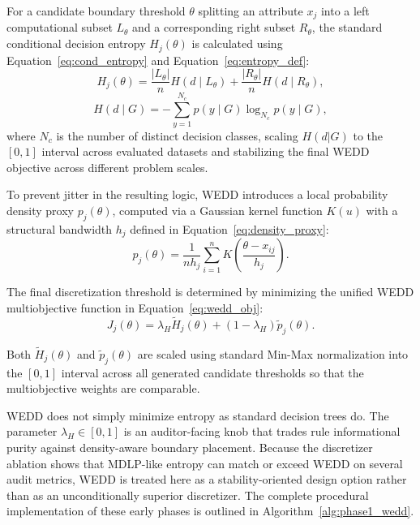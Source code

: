 \documentclass[make,article,submit,pdftex,moreauthors]{Definitions/mdpi}
\begin{document}
For a candidate boundary threshold $\theta$ splitting an attribute $x_j$ into a left computational subset $L_\theta$ and a corresponding right subset $R_\theta$, the standard conditional decision entropy $H_j(\theta)$ is calculated using Equation~\eqref{eq:cond_entropy} and Equation~\eqref{eq:entropy_def}:
\begin{equation}
 \label{eq:cond_entropy}
 H_j(\theta) = \frac{|L_\theta|}{n}H(d\mid L_\theta) + \frac{|R_\theta|}{n}H(d\mid R_\theta),
\end{equation}
\begin{equation}
 \label{eq:entropy_def}
 H(d\mid G) = -\sum_{y=1}^{N_c}p(y\mid G)\log_{N_c} p(y\mid G),
\end{equation}
where $N_c$ is the number of distinct decision classes, scaling $H(d|G)$ to the $[0,1]$ interval across evaluated datasets and stabilizing the final WEDD objective across different problem scales.

To prevent jitter in the resulting logic, WEDD introduces a local probability density proxy $p_j(\theta)$, computed via a Gaussian kernel function $K(u)$ with a structural bandwidth $h_j$ defined in Equation~\eqref{eq:density_proxy}:
\begin{equation}
 \label{eq:density_proxy}
 p_j(\theta) = \frac{1}{n h_j}\sum_{i=1}^{n}K\left(\frac{\theta-x_{ij}}{h_j}\right).
\end{equation}

The final discretization threshold is determined by minimizing the unified WEDD multiobjective function in Equation~\eqref{eq:wedd_obj}:
\begin{equation}
 \label{eq:wedd_obj}
 J_j(\theta) = \lambda_H\widetilde{H}_j(\theta) + (1-\lambda_H)\widetilde{p}_j(\theta).
\end{equation}

Both $\widetilde{H}_j(\theta)$ and $\widetilde{p}_j(\theta)$ are scaled using standard Min-Max normalization into the $[0,1]$ interval across all generated candidate thresholds so that the multiobjective weights are comparable.

WEDD does not simply minimize entropy as standard decision trees do. The parameter $\lambda_H \in [0,1]$ is an auditor-facing knob that trades rule informational purity against density-aware boundary placement. Because the discretizer ablation shows that MDLP-like entropy can match or exceed WEDD on several audit metrics, WEDD is treated here as a stability-oriented design option rather than as an unconditionally superior discretizer. The complete procedural implementation of these early phases is outlined in Algorithm~\ref{alg:phase1_wedd}.
\end{document}
